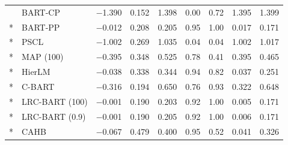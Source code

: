 \documentclass[11pt]{article}
\theoremstyle{definition}
\theoremstyle{plain}
\begin{document}
\begin{longtable}{llccccccc}
& BART-CP & $-$1.390 & 0.152 & 1.398 & 0.00 & 0.72 & 1.395 & 1.399 \\*
& BART-PP & $-$0.012 & 0.208 & 0.205 & 0.95 & 1.00 & 0.017 & 0.171 \\*
& PSCL & $-$1.002 & 0.269 & 1.035 & 0.04 & 0.04 & 1.002 & 1.017 \\*
& MAP (100) & $-$0.395 & 0.348 & 0.525 & 0.78 & 0.41 & 0.395 & 0.465 \\*
& HierLM & $-$0.038 & 0.338 & 0.344 & 0.94 & 0.82 & 0.037 & 0.251 \\*
& C-BART & $-$0.316 & 0.194 & 0.650 & 0.76 & 0.93 & 0.322 & 0.648 \\*
& LRC-BART (100) & $-$0.001 & 0.190 & 0.203 & 0.92 & 1.00 & 0.005 & 0.171 \\*
& LRC-BART (0.9) & $-$0.001 & 0.190 & 0.205 & 0.92 & 1.00 & 0.006 & 0.171 \\*
& CAHB & $-$0.067 & 0.479 & 0.400 & 0.95 & 0.52 & 0.041 & 0.326 \\
\end{longtable}
\endgroup
\end{document}
